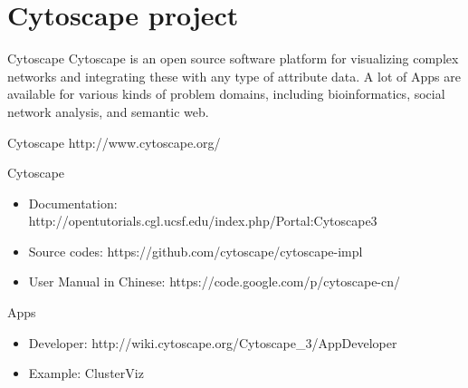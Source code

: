 \documentclass[UTF8]{beamer}
\begin{document}
\section{Cytoscape project}

\begin{frame}[t]{Cytoscape}
  Cytoscape is an open source software platform for visualizing complex networks
   and integrating these with any type of attribute data. A lot of Apps are
   available for various kinds of problem domains, including bioinformatics,
   social network analysis, and semantic web.
\end{frame}

\begin{frame}[t]{Cytoscape}
  http://www.cytoscape.org/
\end{frame}

\begin{frame}[t]{Cytoscape}
  \begin{itemize}
    \item Documentation: http://opentutorials.cgl.ucsf.edu/index.php/Portal:Cytoscape3
    \item Source codes: https://github.com/cytoscape/cytoscape-impl
    \item User Manual in Chinese: https://code.google.com/p/cytoscape-cn/
  \end{itemize}

\end{frame}

\begin{frame}[t]{Apps}
\begin{itemize}
  \item Developer: http://wiki.cytoscape.org/Cytoscape_3/AppDeveloper
  \item Example: ClusterViz
\end{itemize}

\end{frame}
\end{document}

